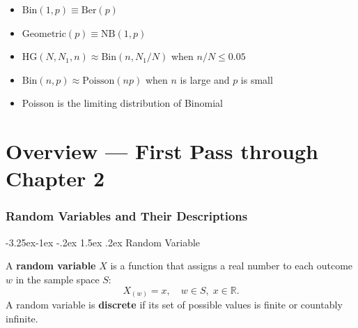 \documentclass{article}
\makeatletter
\theoremstyle{remark}
\newlength{\subsecindent}
\renewcommand\subsection{\@startsection{subsection}{2}{\subsecindent}%
  {-3.25ex\@plus -1ex \@minus -.2ex}%
  {1.5ex \@plus .2ex}%
  {\normalfont\large\bfseries}}
\newenvironment{sub}{%
  \begin{list}{}{%
    \setlength{\leftmargin}{4em}%
    \setlength{\rightmargin}{0pt}%
    \setlength{\topsep}{0pt}%
    \setlength{\partopsep}{0pt}%
    \setlength{\parsep}{\parskip}%
    \setlength{\itemsep}{\parskip}%
  }\item\relax
}{\end{list}}
\newenvironment{secbody}{%
  \begin{list}{}{%
    \setlength{\leftmargin}{\subsecindent}%
    \setlength{\rightmargin}{0pt}%
    \setlength{\topsep}{0pt}%
    \setlength{\partopsep}{0pt}%
    \setlength{\parsep}{\parskip}%
    \setlength{\itemsep}{\parskip}%
  }\item\relax
}{\end{list}}
\newcommand{\R}{\mathbb{R}}
\makeatother
\begin{document}
\begin{secbody}
\begin{itemize}
  \item $\text{Bin}(1,p) \equiv \text{Ber}(p)$
  \item $\text{Geometric}(p) \equiv \text{NB}(1,p)$
  \item $\text{HG}(N, N_1, n) \approx \text{Bin}(n, N_1/N)$ when $n/N \le 0.05$
  \item $\text{Bin}(n,p) \approx \text{Poisson}(np)$ when $n$ is large and $p$ is small
  \item Poisson is the limiting distribution of Binomial
\end{itemize}
\end{secbody}


\newpage
\part{Overview --- First Pass through Chapter 2}
\label{part:overview}

\section{Random Variables and Their Descriptions}
\label{sec:ov-rv}

\subsection{Random Variable}
\begin{sub}

A \textbf{random variable} $X$ is a function that assigns a real number to each outcome $w$ in the sample space $S$:
\[
  X_{(w)} = x, \quad w \in S, \; x \in \R.
\]
A random variable is \textbf{discrete} if its set of possible values is finite or countably infinite.

\end{sub}
\end{document}
